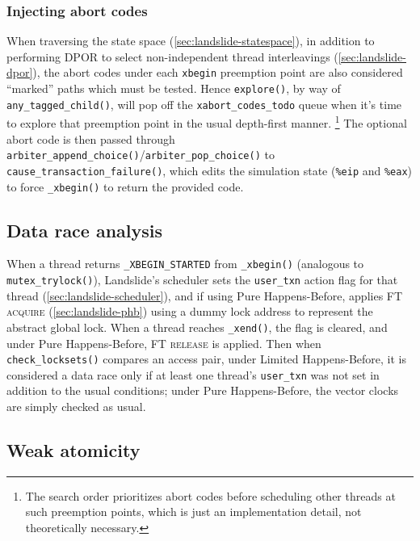 \subsubsection{Injecting abort codes}
When traversing the state space (\cref{sec:landslide-statespace}),
in addition to performing DPOR to select non-independent thread interleavings (\cref{sec:landslide-dpor}),
the abort codes under each {\tt xbegin} preemption point are also considered ``marked'' paths which must be tested.
Hence {\tt explore()}, by way of {\tt any\_tagged\_child()},
will pop off the {\tt xabort\_codes\_todo} queue
when it's time to explore that preemption point in the usual depth-first manner.%
\footnote{The search order prioritizes abort codes before scheduling other threads
at such preemption points,
which is just an implementation detail, not theoretically necessary.}
The optional abort code is then passed through {\tt arbiter\_append\_choice()}/{\tt arbiter\_pop\_choice()}
to {\tt cause\_transaction\_failure()},
which edits the simulation state ({\tt \%eip} and {\tt \%eax})
to force {\tt \_xbegin()} to return the provided code.

\subsection{Data race analysis}
\label{sec:txn-datarace}

When a thread returns {\tt \_XBEGIN\_STARTED} from {\tt \_xbegin()}
(analogous to {\tt mutex\_trylock()}),
Landslide's scheduler sets the {\tt user\_txn} action flag for that thread (\cref{sec:landslide-scheduler}),
and if using Pure Happens-Before,
applies \textsc{FT acquire} (\cref{sec:landslide-phb}) using a dummy lock address to represent the abstract global lock.
When a thread reaches {\tt \_xend()},
the flag is cleared,
and under Pure Happens-Before,
\textsc{FT release} is applied.
Then when {\tt check\_locksets()} compares an access pair,
under Limited Happens-Before,
it is considered a data race only if at least one thread's {\tt user\_txn} was not set
in addition to the usual conditions; %
under Pure Happens-Before,
the vector clocks are simply checked as usual.

\subsection{Weak atomicity}
\label{sec:tm-impl-weak-atomicity}

